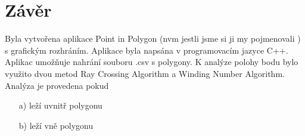 \documentclass[oneside,12pt,a4paper]{book}
\begin{document}
\chapter{Závěr} 
Byla vytvořena aplikace Point in Polygon (nvm jestli jsme si ji my pojmenovali ) s grafickým rozhráním. Aplikace byla napsána v programovacím jazyce C++. Aplikac umožňuje nahrání souboru .csv s polygony. K analýze polohy bodu bylo využito dvou metod Ray Crossing Algorithm a Winding Number Algorithm. Analýza je provedena pokud 
\begin{itemize}
\item[a)] leží uvnitř polygonu
\item[b)] leží vně polygonu

\end{itemize}
\begingroup
    \pageclear
    \printbibliography[title=Literatura]
\endgroup

\end{document}
